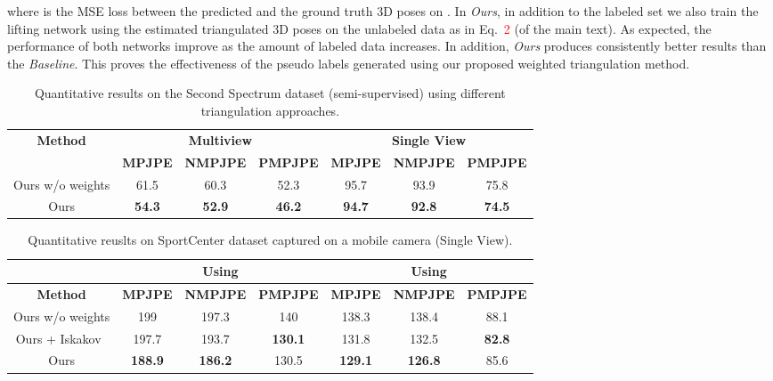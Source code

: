 \documentclass[runningheads]{llncs}
\begin{document}
where  is the MSE loss between the predicted and the ground truth 3D poses on . In {\it Ours}, in addition to the labeled set we also train the lifting network using the estimated triangulated 3D poses on the unlabeled data as in Eq.~\textcolor{red}{2} (of the main text). As expected, the performance of both networks improve as the amount of labeled data increases. In addition, {\it Ours} produces consistently better results than the {\it Baseline}. This proves the effectiveness of the pseudo labels generated using our proposed weighted triangulation method. 











 
\begin{table*}[t]
\caption{Quantitative results on the Second Spectrum dataset (semi-supervised) using different triangulation approaches.}
\label{tab:second_spectrum}
\begin{tabular}{c|ccc|ccc}
\toprule
		\textbf{Method} & \multicolumn{3}{c|}{\textbf{Multiview}} & \multicolumn{3}{c}{\textbf{Single View}} \\
		\cmidrule{1-7}
		& \textbf{MPJPE} & \textbf{NMPJPE} & \textbf{PMPJPE} & \textbf{MPJPE} & \textbf{NMPJPE} & \textbf{PMPJPE} \\
		\midrule
Ours w/o weights & 61.5 & 60.3 & 52.3 & 95.7 & 93.9 & 75.8 \\
Ours & \textbf{54.3} & \textbf{52.9} & \textbf{46.2} & \textbf{94.7} & \textbf{92.8} & \textbf{74.5} \\
\bottomrule
\end{tabular}
\end{table*}
 
\begin{table*}[t]
\caption{Quantitative reuslts on SportCenter dataset captured on a mobile camera (Single View).}
\label{tab:sports_center_semi_supervised_mobile}
\begin{tabular}{c|ccc|ccc}
\toprule
& \multicolumn{3}{c|}{Using  } & \multicolumn{3}{c}{Using } \\
 \midrule
\cmidrule{1-7}
	\textbf{Method} & \textbf{MPJPE} & \textbf{NMPJPE} & \textbf{PMPJPE} & \textbf{MPJPE} & \textbf{NMPJPE} & \textbf{PMPJPE} \\
		\midrule
Ours w/o weights & 199 & 197.3 & 140 & 138.3 & 138.4 & 88.1 \\
Ours + Iskakov~\cite{Iskakov19} & 197.7  & 193.7 & \textbf{130.1} & 131.8 & 132.5 & \textbf{82.8} \\
Ours & \textbf{188.9} & \textbf{186.2} & 130.5 & \textbf{129.1} & \textbf{126.8} & 85.6 \\

\bottomrule
\end{tabular}
\end{table*} 
\end{document}
